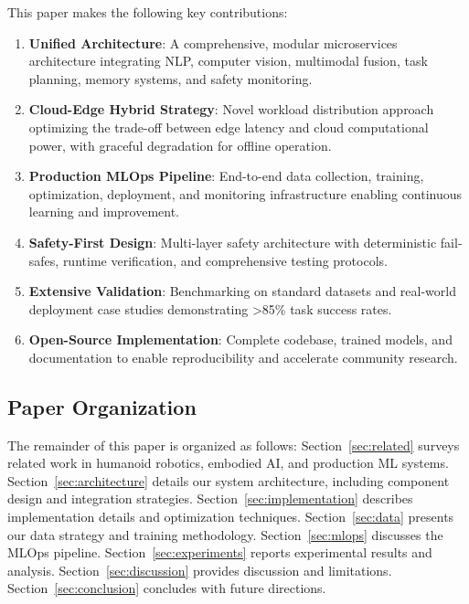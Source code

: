 \documentclass[conference]{IEEEtran}
\begin{document}
This paper makes the following key contributions:

\begin{enumerate}
    \item \textbf{Unified Architecture}: A comprehensive, modular microservices architecture integrating NLP, computer vision, multimodal fusion, task planning, memory systems, and safety monitoring.
    
    \item \textbf{Cloud-Edge Hybrid Strategy}: Novel workload distribution approach optimizing the trade-off between edge latency and cloud computational power, with graceful degradation for offline operation.
    
    \item \textbf{Production MLOps Pipeline}: End-to-end data collection, training, optimization, deployment, and monitoring infrastructure enabling continuous learning and improvement.
    
    \item \textbf{Safety-First Design}: Multi-layer safety architecture with deterministic fail-safes, runtime verification, and comprehensive testing protocols.
    
    \item \textbf{Extensive Validation}: Benchmarking on standard datasets and real-world deployment case studies demonstrating >85\% task success rates.
    
    \item \textbf{Open-Source Implementation}: Complete codebase, trained models, and documentation to enable reproducibility and accelerate community research.
\end{enumerate}

\subsection{Paper Organization}

The remainder of this paper is organized as follows: Section~\ref{sec:related} surveys related work in humanoid robotics, embodied AI, and production ML systems. Section~\ref{sec:architecture} details our system architecture, including component design and integration strategies. Section~\ref{sec:implementation} describes implementation details and optimization techniques. Section~\ref{sec:data} presents our data strategy and training methodology. Section~\ref{sec:mlops} discusses the MLOps pipeline. Section~\ref{sec:experiments} reports experimental results and analysis. Section~\ref{sec:discussion} provides discussion and limitations. Section~\ref{sec:conclusion} concludes with future directions.
\end{document}
